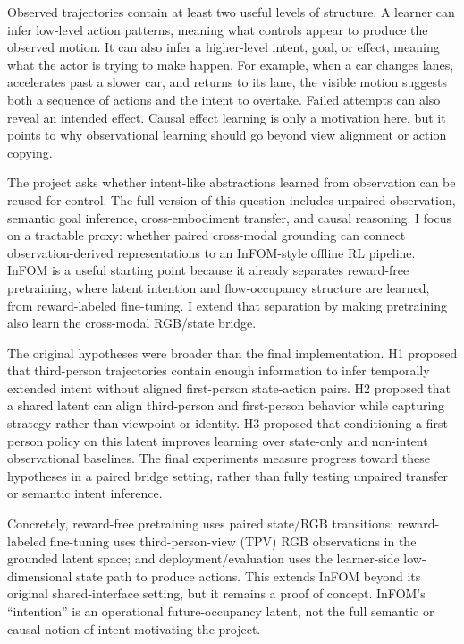 \documentclass{article}
\begin{document}
Observed trajectories contain at least two useful levels of structure. A learner can infer low-level action patterns, meaning what controls appear to produce the observed motion. It can also infer a higher-level intent, goal, or effect, meaning what the actor is trying to make happen. For example, when a car changes lanes, accelerates past a slower car, and returns to its lane, the visible motion suggests both a sequence of actions and the intent to overtake. Failed attempts can also reveal an intended effect. Causal effect learning is only a motivation here, but it points to why observational learning should go beyond view alignment or action copying.

The project asks whether intent-like abstractions learned from observation can be reused for control. The full version of this question includes unpaired observation, semantic goal inference, cross-embodiment transfer, and causal reasoning. I focus on a tractable proxy: whether paired cross-modal grounding can connect observation-derived representations to an InFOM-style offline RL pipeline. InFOM is a useful starting point because it already separates reward-free pretraining, where latent intention and flow-occupancy structure are learned, from reward-labeled fine-tuning. I extend that separation by making pretraining also learn the cross-modal RGB/state bridge.

The original hypotheses were broader than the final implementation. H1 proposed that third-person trajectories contain enough information to infer temporally extended intent without aligned first-person state-action pairs. H2 proposed that a shared latent can align third-person and first-person behavior while capturing strategy rather than viewpoint or identity. H3 proposed that conditioning a first-person policy on this latent improves learning over state-only and non-intent observational baselines. The final experiments measure progress toward these hypotheses in a paired bridge setting, rather than fully testing unpaired transfer or semantic intent inference.

Concretely, reward-free pretraining uses paired state/RGB transitions; reward-labeled fine-tuning uses third-person-view (TPV) RGB observations in the grounded latent space; and deployment/evaluation uses the learner-side low-dimensional state path to produce actions. This extends InFOM beyond its original shared-interface setting, but it remains a proof of concept. InFOM's ``intention'' is an operational future-occupancy latent, not the full semantic or causal notion of intent motivating the project.
\end{document}
